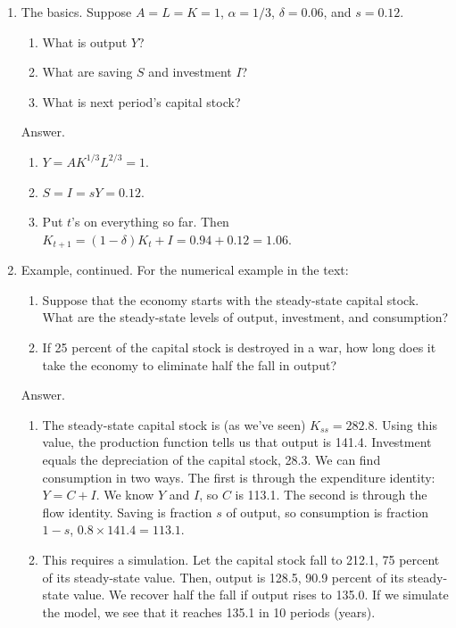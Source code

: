 \begin{enumerate}

\item The basics.  Suppose $A=L=K=1$, $\alpha = 1/3$, $\delta = 0.06$, and $s = 0.12$.
\begin{enumerate}
\item What is output $Y$?
\item What are saving $S$ and investment $I$?
\item What is next period's capital stock?
\end{enumerate}

Answer.
\begin{enumerate}
\item $Y = A K^{1/3} L^{2/3} = 1$.
\item $S=I = s Y = 0.12$.
\item Put $t$'s on everything so far.
Then $K_{t+1} = (1-\delta) K_t + I = 0.94 + 0.12 = 1.06$.
\end{enumerate}


\item Example, continued.  For the numerical example in the text:
\begin{enumerate}
\item Suppose that the economy starts with the steady-state capital stock.
What are the steady-state levels of output, investment, and consumption?
\item If 25 percent of the capital stock is destroyed in a war,
how long does it take the economy to eliminate half the fall in output?
\end{enumerate}

Answer.
\begin{enumerate}
\item The steady-state capital stock is (as we've seen) $K_{ss} = 282.8$.
Using this value, the production function tells us that output is 141.4.
Investment equals the depreciation of the capital stock, 28.3.
We can find consumption in two ways.
The first is through the expenditure identity:  $Y = C + I$.
We know $Y$ and $I$, so $C$ is 113.1.
The second is through the flow identity.
Saving is fraction $s$ of output, so consumption is fraction $1-s$,
$ 0.8 \times 141.4 = 113.1 $.
\item This requires a simulation.
Let the capital stock fall to 212.1, 75 percent of its steady-state value.
Then, output is 128.5, 90.9 percent of its steady-state value.
We recover half the fall if output rises to 135.0.
If we simulate the model, we see that it reaches 135.1 in 10 periods (years).
\end{enumerate}


\end{enumerate}
